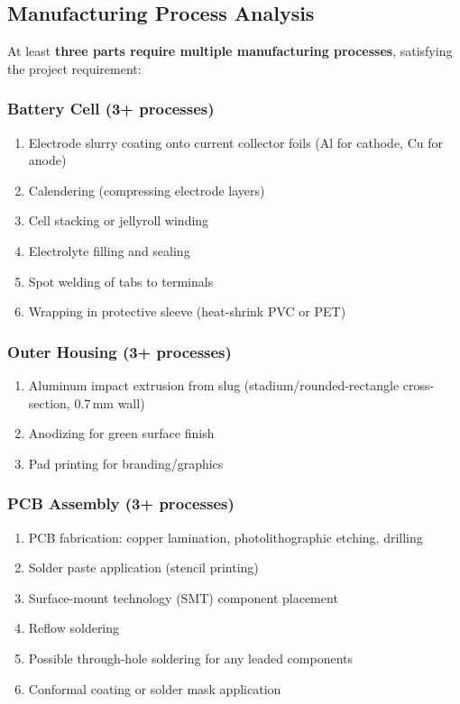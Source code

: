 \subsection{Manufacturing Process Analysis}
\label{sec:processes}

At least \textbf{three parts require multiple manufacturing processes}, satisfying the project requirement:

\subsubsection{Battery Cell (3+ processes)}
\begin{enumerate}
    \item Electrode slurry coating onto current collector foils (Al for cathode, Cu for anode)
    \item Calendering (compressing electrode layers)
    \item Cell stacking or jellyroll winding
    \item Electrolyte filling and sealing
    \item Spot welding of tabs to terminals
    \item Wrapping in protective sleeve (heat-shrink PVC or PET)
\end{enumerate}

\subsubsection{Outer Housing (3+ processes)}
\begin{enumerate}
    \item Aluminum impact extrusion from slug (stadium/rounded-rectangle cross-section, 0.7\,mm wall)
    \item Anodizing for green surface finish
    \item Pad printing for branding/graphics
\end{enumerate}

\subsubsection{PCB Assembly (3+ processes)}
\begin{enumerate}
    \item PCB fabrication: copper lamination, photolithographic etching, drilling
    \item Solder paste application (stencil printing)
    \item Surface-mount technology (SMT) component placement
    \item Reflow soldering
    \item Possible through-hole soldering for any leaded components 
    \item Conformal coating or solder mask application
\end{enumerate}

